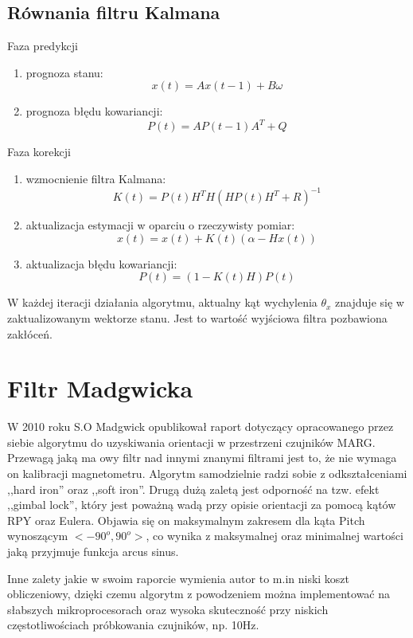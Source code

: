 \subsection{Równania filtru Kalmana}

Faza predykcji
\begin{enumerate}
    \item prognoza stanu: $$x(t) = Ax(t-1) + B \omega$$
    \item prognoza błędu kowariancji: $$P(t) = AP(t-1)A^T+Q$$
\end{enumerate}
%
Faza korekcji
\begin{enumerate}
    \item wzmocnienie filtra Kalmana: $$K(t) = P(t)H^TH(HP(t)H^T+R)^{-1}$$
    \item aktualizacja estymacji w oparciu o rzeczywisty pomiar: $$x(t) = x(t) + K(t)(\alpha - Hx(t))$$
    \item aktualizacja błędu kowariancji: $$P(t) = (1 - K(t)H)P(t)$$
\end{enumerate}

W każdej iteracji działania algorytmu, aktualny kąt wychylenia $\theta_x$ znajduje się w zaktualizowanym wektorze stanu. Jest to wartość wyjściowa filtra pozbawiona zakłóceń.

\section{Filtr Madgwicka}

W 2010 roku S.O Madgwick opublikował raport \cite{Madgwick2010AnEO} dotyczący opracowanego przez siebie algorytmu do uzyskiwania orientacji w przestrzeni czujników MARG. Przewagą jaką ma owy filtr nad innymi znanymi filtrami jest to, że nie wymaga on kalibracji magnetometru. Algorytm samodzielnie radzi sobie z odkształceniami ,,hard iron'' oraz ,,soft iron''. Drugą dużą zaletą jest odporność na tzw. efekt ,,gimbal lock'', który jest poważną wadą przy opisie orientacji za pomocą kątów RPY oraz Eulera. Objawia się on maksymalnym zakresem dla kąta Pitch wynoszącym $<-90^o, 90^o>$, co wynika z maksymalnej oraz minimalnej wartości jaką przyjmuje funkcja arcus sinus.

Inne zalety jakie w swoim raporcie wymienia autor to m.in niski koszt obliczeniowy, dzięki czemu algorytm z powodzeniem można implementować na słabszych mikroprocesorach oraz wysoka skuteczność przy niskich częstotliwościach próbkowania czujników, np. 10Hz.

